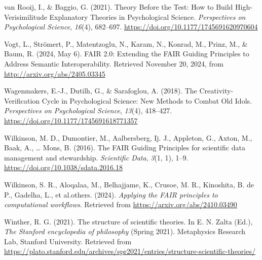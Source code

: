 \documentclass[
  man, noextraspace,floatsintext]{apa6}
\newlength{\cslhangindent}
\newenvironment{CSLReferences}[2] %
 {\begin{list}{}{%
  \setlength{\itemindent}{0pt}
  \setlength{\leftmargin}{0pt}
  \setlength{\parsep}{0pt}
  \ifodd #1
   \setlength{\leftmargin}{\cslhangindent}
   \setlength{\itemindent}{-1\cslhangindent}
  \fi
  \setlength{\itemsep}{#2\baselineskip}}}
 {\end{list}}
\begin{document}
\begin{CSLReferences}{1}{0}
van Rooij, I., \& Baggio, G. (2021). Theory {Before} the {Test}: {How} to {Build High-Verisimilitude Explanatory Theories} in {Psychological Science}. \emph{Perspectives on Psychological Science}, \emph{16}(4), 682--697. \url{https://doi.org/10.1177/1745691620970604}

Vogt, L., Strömert, P., Matentzoglu, N., Karam, N., Konrad, M., Prinz, M., \& Baum, R. (2024, May 6). {FAIR} 2.0: {Extending} the {FAIR Guiding Principles} to {Address Semantic Interoperability}. Retrieved November 20, 2024, from \url{http://arxiv.org/abs/2405.03345}

Wagenmakers, E.-J., Dutilh, G., \& Sarafoglou, A. (2018). The {Creativity-Verification Cycle} in {Psychological Science}: {New Methods} to {Combat Old Idols}. \emph{Perspectives on Psychological Science}, \emph{13}(4), 418--427. \url{https://doi.org/10.1177/1745691618771357}

Wilkinson, M. D., Dumontier, M., Aalbersberg, Ij. J., Appleton, G., Axton, M., Baak, A., \ldots{} Mons, B. (2016). The {FAIR Guiding Principles} for scientific data management and stewardship. \emph{Scientific Data}, \emph{3}(1, 1), 1--9. \url{https://doi.org/10.1038/sdata.2016.18}

Wilkinson, S. R., Aloqalaa, M., Belhajjame, K., Crusoe, M. R., Kinoshita, B. de P., Gadelha, L., et al.others. (2024). \emph{Applying the {FAIR} principles to computational workflows}. Retrieved from \url{https://arxiv.org/abs/2410.03490}

Winther, R. G. (2021). The structure of scientific theories. In E. N. Zalta (Ed.), \emph{The {Stanford} encyclopedia of philosophy} (Spring 2021). Metaphysics Research Lab, Stanford University. Retrieved from \url{https://plato.stanford.edu/archives/spr2021/entries/structure-scientific-theories/}

\end{CSLReferences}
\end{document}
